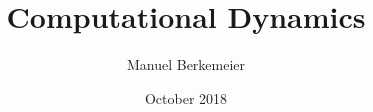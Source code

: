 \documentclass[11pt]{report}
\title{Computational Dynamics}
\author{Manuel Berkemeier}
\date{October 2018}
\begin{document}
\nocite{*}
\maketitle





\end{document}
